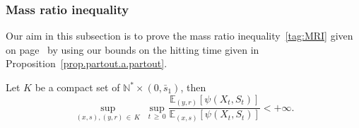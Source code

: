 \documentclass[AHL,Unicode,longabstracts,published]{cedram}
\newcommand{\NN}{\mathbb{N}}
\newcommand{\EE}{\mathbb{E}}
\newcommand{\1}{\mathbf{1}}
\begin{document}
\subsubsection{Mass ratio inequality}\label{sec:mass.ratio}

Our aim in this subsection is to prove the mass ratio inequality~\eqref{tag:MRI} given on page~\pageref{tag:MRI} by using our bounds on the hitting time given in Proposition~\ref{prop.partout.a.partout}.

\begin{lemm}\label{lem:ratio}
Let $K$ be a compact set of $\NN^*\times (0,\bar s_1)$, then
\[
\sup_{(x,s),(y,r)\,\in \,K}\; \sup_{t\,\geq\,0} \frac{\EE_{(y,r)} \left[\psi (X_{t}, S_{t})\right]}{\EE_{(x,s)} \left[\psi (X_{t}, S_{t})\right]} <+ \infty.
\]
\end{lemm}
\end{document}
